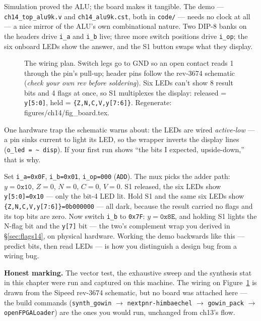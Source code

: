 Simulation proved the ALU; the board makes it tangible. The demo
--- \texttt{ch14\_top\_alu9k.v} and \texttt{ch14\_alu9k.cst}, both in
\texttt{code/} --- needs no clock at all --- a nice mirror of the ALU's own
combinational nature. Two DIP-8 banks on the headers drive
\texttt{i\_a} and \texttt{i\_b} live; three more switch positions drive
\texttt{i\_op}; the six onboard LEDs show the answer, and the S1
button swaps what they display.

\begin{figure}[htbp]
\centering

\caption{The wiring plan. Switch legs go to GND so an open contact
reads 1 through the pin's pull-up; header pins follow the rev-3674
schematic (\emph{check your own rev before soldering}). Six LEDs can't
show 8 result bits and 4 flags at once, so S1 multiplexes the display:
released = \texttt{y[5:0]}, held = \texttt{\{Z,N,C,V,y[7:6]\}}.
Regenerate: \ttfamily figures/ch14/fig\_board.tex.}
\label{fig:board14}
\end{figure}

One hardware trap the schematic warns about: the LEDs are wired
\emph{active-low} --- a pin sinks current to light its LED, so the
wrapper inverts the display lines (\texttt{o\_led = \textasciitilde
disp}). If your first run shows ``the bits I expected, upside-down,''
that is why.

\begin{example}
Set \texttt{i\_a=0x0F}, \texttt{i\_b=0x01}, \texttt{i\_op=000}
(\texttt{ADD}). The mux picks the adder path:
$y=\texttt{0x10}$, $Z=0$, $N=0$, $C=0$, $V=0$. S1 released, the six
LEDs show \texttt{y[5:0]=0x10} --- only the bit-4 LED lit. Hold S1 and
the same six LEDs show
\texttt{\{Z,N,C,V,y[7:6]\}=0b000000} --- all dark, because the result
carried no flags and its top bits are zero. Now switch
\texttt{i\_b} to \texttt{0x7F}: $y=\texttt{0x8E}$, and holding S1
lights the N-flag bit and the \texttt{y[7]} bit --- the two's
complement wrap you derived in \S\ref{sec:flags14}, on physical
hardware. Working the demo backwards like this --- predict bits,
then read LEDs --- is how you distinguish a design bug from a
wiring bug.
\end{example}

\textbf{Honest marking.} The vector test, the exhaustive sweep and
the synthesis stat in this chapter were run and captured on this
machine. The wiring on Figure~\ref{fig:board14} is drawn from the
Sipeed rev-3674 schematic, but no board was attached here --- the
build commands (\texttt{synth\_gowin} $\to$
\texttt{nextpnr-himbaechel} $\to$ \texttt{gowin\_pack} $\to$
\texttt{openFPGALoader}) are the ones you would run, unchanged from
ch13's flow.

